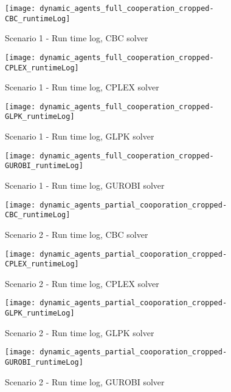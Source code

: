 \begin{figure}[H]
	\centering
	\texttt{[image: dynamic\_agents\_full\_cooperation\_cropped-CBC\_runtimeLog]}
	\caption{Scenario 1 - Run time log, CBC solver}
	\label{fig:runtimelog_scenario1-CBC}
\end{figure}
\begin{figure}[H]
	\centering
	\texttt{[image: dynamic\_agents\_full\_cooperation\_cropped-CPLEX\_runtimeLog]}
	\caption{Scenario 1 - Run time log, CPLEX solver}
	\label{fig:runtimelog_scenario1-CPLEX}
\end{figure}
\begin{figure}[H]
	\centering
	\texttt{[image: dynamic\_agents\_full\_cooperation\_cropped-GLPK\_runtimeLog]}
	\caption{Scenario 1 - Run time log, GLPK solver}
	\label{fig:runtimelog_scenario1-GLPK}
\end{figure}
\begin{figure}[H]
	\centering
	\texttt{[image: dynamic\_agents\_full\_cooperation\_cropped-GUROBI\_runtimeLog]}
	\caption{Scenario 1 - Run time log, GUROBI solver}
	\label{fig:runtimelog_scenario-GUROBI}
\end{figure}


\begin{figure}[H]
	\centering
	\texttt{[image: dynamic\_agents\_partial\_cooporation\_cropped-CBC\_runtimeLog]}
	\caption{Scenario 2 - Run time log, CBC solver}
	\label{fig:runtimelog_scenario2-CBC}
\end{figure}\begin{figure}[H]
	\centering
	\texttt{[image: dynamic\_agents\_partial\_cooporation\_cropped-CPLEX\_runtimeLog]}
	\caption{Scenario 2 - Run time log, CPLEX solver}
	\label{fig:runtimelog_scenario2-CPLEX}
\end{figure}\begin{figure}[H]
	\centering
	\texttt{[image: dynamic\_agents\_partial\_cooporation\_cropped-GLPK\_runtimeLog]}
	\caption{Scenario 2 - Run time log, GLPK solver}
	\label{fig:runtimelog_scenario2-GLPK}
\end{figure}\begin{figure}[H]
	\centering
	\texttt{[image: dynamic\_agents\_partial\_cooporation\_cropped-GUROBI\_runtimeLog]}
	\caption{Scenario 2 - Run time log, GUROBI solver}
	\label{fig:runtimelog_scenario2-GUROBI}
\end{figure}


